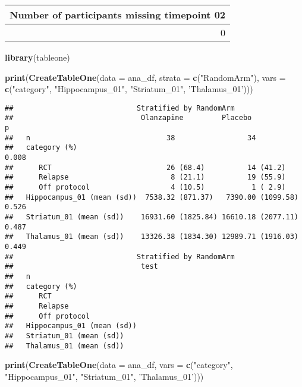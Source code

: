\documentclass[]{article}
\newenvironment{Shaded}{\begin{snugshade}}{\end{snugshade}}
\newcommand{\KeywordTok}[1]{\textcolor[rgb]{0.13,0.29,0.53}{\textbf{#1}}}
\newcommand{\DataTypeTok}[1]{\textcolor[rgb]{0.13,0.29,0.53}{#1}}
\newcommand{\StringTok}[1]{\textcolor[rgb]{0.31,0.60,0.02}{#1}}
\newcommand{\NormalTok}[1]{#1}
\theoremstyle{definition}
\theoremstyle{definition}
\theoremstyle{definition}
\theoremstyle{remark}
\begin{document}
\begin{tabular}{r}
\hline
Number of participants missing timepoint 02\\
\hline
0\\
\hline
\end{tabular}

\begin{Shaded}
\begin{Highlighting}[]
\KeywordTok{library}\NormalTok{(tableone)}

\KeywordTok{print}\NormalTok{(}\KeywordTok{CreateTableOne}\NormalTok{(}\DataTypeTok{data =}\NormalTok{ ana_df,}
               \DataTypeTok{strata =} \KeywordTok{c}\NormalTok{(}\StringTok{"RandomArm"}\NormalTok{),}
               \DataTypeTok{vars =} \KeywordTok{c}\NormalTok{(}\StringTok{"category"}\NormalTok{, }\StringTok{"Hippocampus_01"}\NormalTok{, }\StringTok{"Striatum_01"}\NormalTok{, }\StringTok{'Thalamus_01'}\NormalTok{)))}
\end{Highlighting}
\end{Shaded}

\begin{verbatim}
##                             Stratified by RandomArm
##                              Olanzapine         Placebo            p     
##   n                                38                 34                 
##   category (%)                                                      0.008
##      RCT                           26 (68.4)          14 (41.2)          
##      Relapse                        8 (21.1)          19 (55.9)          
##      Off protocol                   4 (10.5)           1 ( 2.9)          
##   Hippocampus_01 (mean (sd))  7538.32 (871.37)   7390.00 (1099.58)  0.526
##   Striatum_01 (mean (sd))    16931.60 (1825.84) 16610.18 (2077.11)  0.487
##   Thalamus_01 (mean (sd))    13326.38 (1834.30) 12989.71 (1916.03)  0.449
##                             Stratified by RandomArm
##                              test
##   n                              
##   category (%)                   
##      RCT                         
##      Relapse                     
##      Off protocol                
##   Hippocampus_01 (mean (sd))     
##   Striatum_01 (mean (sd))        
##   Thalamus_01 (mean (sd))
\end{verbatim}

\begin{Shaded}
\begin{Highlighting}[]
\KeywordTok{print}\NormalTok{(}\KeywordTok{CreateTableOne}\NormalTok{(}\DataTypeTok{data =}\NormalTok{ ana_df,}
               \DataTypeTok{vars =} \KeywordTok{c}\NormalTok{(}\StringTok{"category"}\NormalTok{, }\StringTok{"Hippocampus_01"}\NormalTok{, }\StringTok{"Striatum_01"}\NormalTok{, }\StringTok{'Thalamus_01'}\NormalTok{)))}
\end{Highlighting}
\end{Shaded}
\end{document}
